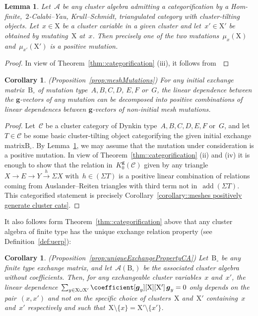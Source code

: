 \documentclass{amsart}
\newtheorem{corollary}[theorem]{Corollary}
\newtheorem{lemma}[theorem]{Lemma}
\theoremstyle{definition}
\renewcommand{\b}[1]{{\boldsymbol{#1}}} %
\newcommand{\cluster}{\mathrm{X}} %
\newcommand{\B}{\mathrm{B}} %
\newcommand{\cat}{\mathcal{C}}
\newcommand{\susp}{\Sigma}
\newcommand{\add}{\operatorname{add}}
\newcommand{\Kg}{K_0^{\b{g}}}
\begin{document}
\begin{lemma}
\label{lemma:positive mutation triangles}
Let~$\mathcal{A}$ be any cluster algebra admitting a categorification by a Hom-finite,~$2$-Calabi--Yau, Krull--Schmidt, triangulated category with cluster-tilting objects.
Let~$x\in\cluster$ be a cluster cariable in a given cluster and let~$x'\in \cluster'$ be obtained by mutating~$\cluster$ at~$x$.
Then precisely one of the two mutations~$\mu_x(\cluster)$ and~$\mu_{x'}(\cluster')$ is a positive mutation.
\end{lemma}

\begin{proof}
In view of Theorem~\ref{thm::categorification} (iii), it follows from~\cite[Lemma 3.3]{Palu}
\end{proof}

\begin{corollary}\emph{(Proposition~\ref{prop:meshMutations})}
\label{corollary:proof of prop meshMutations}
 For any initial exchange matrix~$\B_\circ$ of mutation type~$A, B, C, D$, $E, F$ or~$G$, the linear dependence between the $\b{g}$-vectors of any mutation can be decomposed into positive combinations of linear dependences between $\b{g}$-vectors of non-initial mesh mutations.
\end{corollary}

\begin{proof}
Let~$\cat$ be a cluster category of Dynkin type~$A,B,C,D,E,F$ or~$G$, and let $T\in\cat$ be some basic cluster-tilting object categorifying the given initial exchange matrix$\B_\circ$. 
By Lemma~\ref{lemma:positive mutation triangles}, we may assume that the mutation under consideration is a positive mutation.
In view of Theorem~\ref{thm::categorification} (ii) and (iv) it is enough to show that the relation in~$\Kg(\cat)$ given by any triangle~$X\to E\to Y\xrightarrow{h} \susp X$ with~$h\in(\susp T)$ is a positive linear combination of relations coming from Auslander--Reiten triangles with third term not in~$\add(\susp T)$.
This categorified statement is precisely Corollary~\ref{corollary::meshes positively generate cluster cats}.
\end{proof}

It also follows form Theorem~\ref{thm::categorification} above that any cluster algebra of finite type has the unique exchange relation property (see Definition~\ref{def:uerp}):
\begin{corollary}
\label{corollary:UERPforCAproof}
\emph{(Proposition~\ref{prop:uniqueExchangePropertyCA})}
Let~$\B_\circ$ be any finite type exchange matrix, and let~$\mathcal{A}(\B_\circ)$ be the associated cluster algebra without coefficients.
Then, for any exchangeable cluster variables~$x$ and~$x'$, the linear dependence $\sum_{y \in \cluster \cup \cluster'} \coefficient[{\b{g}_y}][\cluster][\cluster'] \, \b{g}_y = 0$ only depends on the pair~$(x,x')$ and not on the specific choice of clusters~$\cluster$ and~$\cluster'$ containing~$x$ and~$x'$ respectively and such that~$\cluster\setminus\{x\}=\cluster'\setminus\{x'\}$.
\end{corollary}
\end{document}
